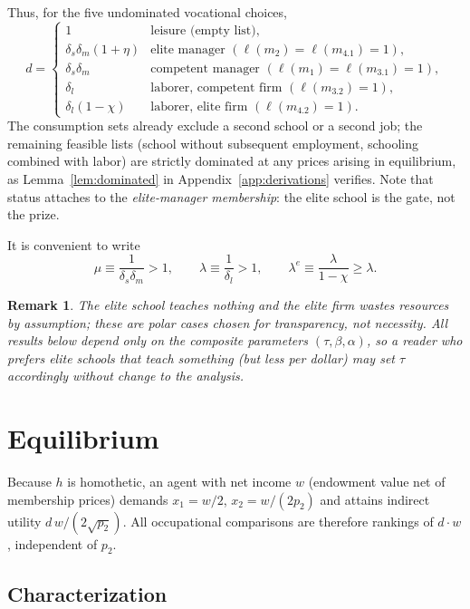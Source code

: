 \documentclass[12pt,letterpaper]{article}
\newtheorem{remark}{Remark}
\theoremstyle{definition}
\begin{document}
Thus, for the five undominated vocational choices, \[ d = \begin{cases} 1 & \text{leisure (empty list)},\\ \delta_s\delta_m(1+\eta) & \text{elite manager } (\ell(m_2)=\ell(m_{4.1})=1),\\ \delta_s\delta_m & \text{competent manager } (\ell(m_1)=\ell(m_{3.1})=1),\\ \delta_l & \text{laborer, competent firm } (\ell(m_{3.2})=1),\\ \delta_l(1-\chi) & \text{laborer, elite firm } (\ell(m_{4.2})=1).
\end{cases}
\] The consumption sets already exclude a second school or a second job; the remaining feasible lists (school without subsequent employment, schooling combined with labor) are strictly dominated at any prices arising in equilibrium, as Lemma~\ref{lem:dominated} in Appendix~\ref{app:derivations} verifies.
Note that status attaches to the \emph{elite-manager membership}: the elite school is the gate, not the prize.

It is convenient to write \[ \mu \equiv \frac{1}{\delta_s\delta_m}>1, \qquad \lambda \equiv \frac{1}{\delta_l}>1, \qquad \lambda^{e} \equiv \frac{\lambda}{1-\chi}\geq\lambda .
\]

\begin{remark}\label{rem:polar} The elite school teaches nothing and the elite firm wastes resources by assumption; these are polar cases chosen for transparency, not necessity.
All results below depend only on the composite parameters $(\tau,\beta,\alpha)$, so a reader who prefers elite schools that teach something (but less per dollar) may set $\tau$ accordingly without change to the analysis.
\end{remark}

\section{Equilibrium}\label{sec:equilibrium}

Because $h$ is homothetic, an agent with net income $w$ (endowment value net of membership prices) demands $x_1=w/2$, $x_2=w/(2p_2)$ and attains indirect utility $d\, w/(2\sqrt{p_2})$.
All occupational comparisons are therefore rankings of $d\cdot w$, independent of $p_2$.

\subsection{Characterization}
\end{document}
